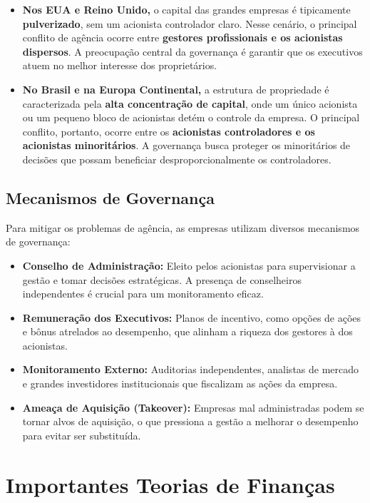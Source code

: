\documentclass[
  a4paper,
]{book}
\providecommand{\tightlist}{%
  \setlength{\itemsep}{0pt}\setlength{\parskip}{0pt}}\usepackage{longtable,booktabs,array}
\begin{document}
\begin{itemize}
\tightlist
\item
  \textbf{Nos EUA e Reino Unido,} o capital das grandes empresas é
  tipicamente \textbf{pulverizado}, sem um acionista controlador claro.
  Nesse cenário, o principal conflito de agência ocorre entre
  \textbf{gestores profissionais e os acionistas dispersos}. A
  preocupação central da governança é garantir que os executivos atuem
  no melhor interesse dos proprietários.
\item
  \textbf{No Brasil e na Europa Continental,} a estrutura de propriedade
  é caracterizada pela \textbf{alta concentração de capital}, onde um
  único acionista ou um pequeno bloco de acionistas detém o controle da
  empresa. O principal conflito, portanto, ocorre entre os
  \textbf{acionistas controladores e os acionistas minoritários}. A
  governança busca proteger os minoritários de decisões que possam
  beneficiar desproporcionalmente os controladores.
\end{itemize}

\subsection{Mecanismos de Governança}\label{mecanismos-de-governanuxe7a}

Para mitigar os problemas de agência, as empresas utilizam diversos
mecanismos de governança:

\begin{itemize}
\tightlist
\item
  \textbf{Conselho de Administração:} Eleito pelos acionistas para
  supervisionar a gestão e tomar decisões estratégicas. A presença de
  conselheiros independentes é crucial para um monitoramento eficaz.
\item
  \textbf{Remuneração dos Executivos:} Planos de incentivo, como opções
  de ações e bônus atrelados ao desempenho, que alinham a riqueza dos
  gestores à dos acionistas.
\item
  \textbf{Monitoramento Externo:} Auditorias independentes, analistas de
  mercado e grandes investidores institucionais que fiscalizam as ações
  da empresa.
\item
  \textbf{Ameaça de Aquisição (Takeover):} Empresas mal administradas
  podem se tornar alvos de aquisição, o que pressiona a gestão a
  melhorar o desempenho para evitar ser substituída.
\end{itemize}

\section{Importantes Teorias de
Finanças}\label{importantes-teorias-de-finanuxe7as}
\end{document}
